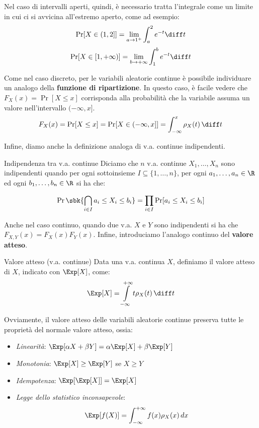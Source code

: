 \documentclass[a4paper, 12pt]{report}
\begin{document}
    Nel caso di intervalli aperti, quindi, è necessario tratta l'integrale come un limite in cui ci si avvicina all'estremo aperto, come ad esempio:
    \[\Pr[X \in (1,2]] = \lim_{a \to 1^+} \int_{a}^2 e^{-t} \diff t\]
    \[\Pr[X \in [1, +\infty)] = \lim_{b \to +\infty} \int_1^{b} e^{-t} \diff t\] 

    Come nel caso discreto, per le variabili aleatorie continue è possibile individuare un analogo della \textbf{funzione di ripartizione}. In questo caso, è facile vedere che $F_X(x) = \Pr[X \leq x]$ corrisponda alla probabilità che la variabile assuma un valore nell'intervallo $(-\infty, x]$.
    \[F_X(x) = \Pr[X \leq x] = \Pr[X \in (-\infty, x]] = \int_{-\infty}^x \rho_X(t) \, \diff t\]

    Infine, diamo anche la definizione analoga di v.a. continue indipendenti.

    \begin{frameddefn}{Indipendenza tra v.a. continue}
        Diciamo che $n$ v.a. continue $X_1, \ldots, X_n$ sono indipendenti quando per ogni sottoinsieme $I \subseteq \{1,\ldots, n\}$, per ogni $a_1, \ldots, a_n \in \R$ ed ogni $b_1, \ldots, b_n \in \R$ si ha che:

        \[\Pr\sbk{\bigcap_{i \in I} a_i \leq X_i \leq b_i} = \prod_{i \in I} \Pr[a_i \leq X_i \leq b_i]\]

    \end{frameddefn}

    Anche nel caso continuo, quando due v.a. $X$ e $Y$ sono indipendenti si ha che $F_{X,Y}(x) = F_X(x)F_Y(x)$. Infine, introduciamo l'analogo continuo del \textbf{valore atteso}.

    \begin{frameddefn}{Valore atteso (v.a. continue)}
        Data una v.a. continua $X$, definiamo il valore atteso di $X$, indicato con $\Exp[X]$, come:
        \[\Exp[X] = \int\limits_{-\infty}^{+\infty} t \rho_X(t) \, \diff t\]
    \end{frameddefn}

    Ovviamente, il valore atteso delle variabili aleatorie continue preserva tutte le proprietà del normale valore atteso, ossia:
    \begin{itemize}
        \item \textit{Linearità}: $\Exp[\alpha X+\beta Y] = \alpha\Exp[X]+\beta \Exp[Y]$
        \item \textit{Monotonia}: $\Exp[X] \geq \Exp[Y]$ se $X \geq Y$
        \item \textit{Idempotenza}: $\Exp[\Exp[X]] = \Exp[X]$
        \item \textit{Legge dello statistico inconsapevole}: \[\Exp[f(X)] = \int_{-\infty}^{+\infty} f(x) \rho_X(x) \, dx\]
    \end{itemize}
    
\end{document}
